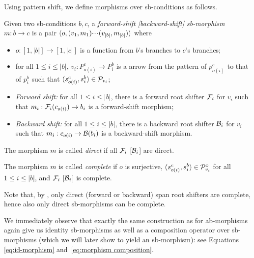 Using pattern shift, we define morphisms over sb-conditions as follows.
%
\begin{definition}
  Given two sb-conditions $b,c$, a \emph{forward-shift [backward-shift] sb-morphism} $m:b\to c$ is a pair $(o,(v_1,m_1){\cdotp\mkern-2mu\cdotp\mkern-2mu\cdotp\mkern1mu} (v_{|b|},m_{|b|}))$ where
  \begin{itemize}[topsep=\smallskipamount]
  \item $o:[1,|b|]\to [1,|c|]$ is a function from $b$'s branches to $c$'s branches;
  \item for all $1\leq i\leq |b|$, $v_i:P^c_{o(i)}\to P^b_i$ is a arrow from the pattern of $p^c_{o(i)}$ to that of $p^b_i$ such that $(s^c_{o(i)},s^b_i)\in \mathcal{P}_{v_i}$;
  \item \emph{Forward shift:} for all $1\leq i\leq |b|$, there is a forward root shifter $\mathcal{F}_i$ for $v_i$ such that $m_i:\mathcal{F}_i(c_{o(i)})\to b_i$ is a forward-shift morphism;
  \item \emph{Backward shift:} for all $1\leq i\leq |b|$, there is a backward root shifter $\mathcal{B}_i$ for $v_i$ such that $m_i:c_{o(i)}\to \mathcal{B}(b_i)$ is a backward-shift morphism.
  \end{itemize}
  The morphism $m$ is called \emph{direct} if all $\mathcal{F}_i$ [$\mathcal{B}_i$] are direct.
  
  The morphism $m$ is called \emph{complete} if $o$ is surjective, $(s^c_{o(i)},s^b_i)\in \mathcal{P}^\circ_{v_i}$ for all $1\leq i\leq |b|$, and $\mathcal{F}_i$ [$\mathcal{B}_i$] is complete.
\end{definition}
%
Note that, by , only direct (forward or backward) span root shifters are complete, hence also only direct sb-morphisms can be complete.

%
We immediately observe that  exactly the same construction as for ab-morphisms again give us identity sb-morphisms as well as a composition operator over sb-morphisms (which we will later show to yield an sb-morphism): see Equations \eqref{eq:id-morphism} and~\eqref{eq:morphism composition}.


